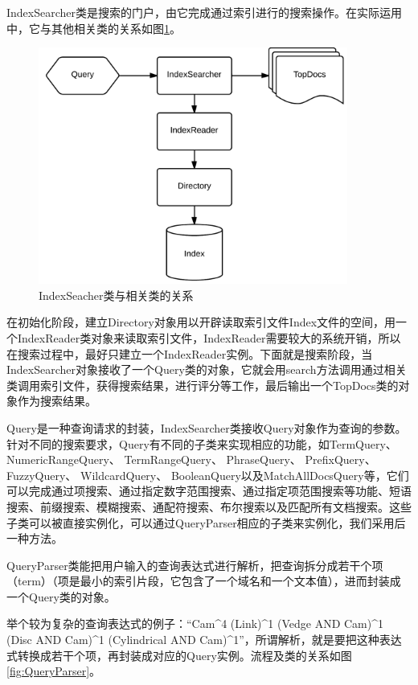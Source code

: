 \documentclass[12pt,a4paper]{article}
\begin{document}
	IndexSearcher类是搜索的门户，由它完成通过索引进行的搜索操作。在实际运用中，它与其他相关类的关系如图\ref{fig:IndexSeacher类与相关类的关系}。
	
	\begin{figure}[htbp] 
	\centering\includegraphics[width=4in]{fig/IndexSearcher.png} 
	\caption{IndexSeacher类与相关类的关系}\label{fig:IndexSeacher类与相关类的关系} 
	\end{figure} 
	
	在初始化阶段，建立Directory对象用以开辟读取索引文件Index文件的空间，用一个IndexReader类对象来读取索引文件，IndexReader需要较大的系统开销，所以在搜索过程中，最好只建立一个IndexReader实例。下面就是搜索阶段，当IndexSearcher对象接收了一个Query类的对象，它就会用search方法调用通过相关类调用索引文件，获得搜索结果，进行评分等工作，最后输出一个TopDocs类的对象作为搜索结果。	
	\vspace{6pt}
	
	Query是一种查询请求的封装，IndexSearcher类接收Query对象作为查询的参数。针对不同的搜索要求，Query有不同的子类来实现相应的功能，如TermQuery、 NumericRangeQuery、 TermRangeQuery、 PhraseQuery、 PrefixQuery、 FuzzyQuery、 WildcardQuery、 BooleanQuery以及MatchAllDocsQuery等，它们可以完成通过项搜索、通过指定数字范围搜索、通过指定项范围搜索等功能、短语搜索、前缀搜索、模糊搜索、通配符搜索、布尔搜索以及匹配所有文档搜索。这些子类可以被直接实例化，可以通过QueryParser相应的子类来实例化，我们采用后一种方法。
	\vspace{6pt}
	
	QueryParser类能把用户输入的查询表达式进行解析，把查询拆分成若干个项（term）（项是最小的索引片段，它包含了一个域名和一个文本值），进而封装成一个Query类的对象。
	
	举个较为复杂的查询表达式的例子：“Cam\^{}4 (Link)\^{}1 (Vedge AND Cam)\^{}1 (Disc AND Cam)\^{}1 (Cylindrical AND Cam)\^{}1”，所谓解析，就是要把这种表达式转换成若干个项，再封装成对应的Query实例。流程及类的关系如图\ref{fig:QueryParser}。
	
\end{document}
